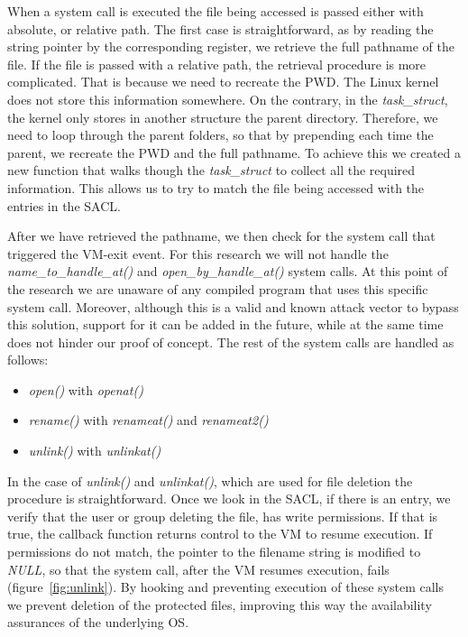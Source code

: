 \par When a system call is executed the file being accessed is passed either with absolute, or relative path. The first case is straightforward, as by reading the string pointer by the corresponding register, we retrieve the full pathname of the file. If the file is passed with a relative path, the retrieval procedure is more complicated. That is because we need to recreate the \ac{PWD}. The Linux kernel does not store this information somewhere. On the contrary, in the \textit{task\_struct}, the kernel only stores in another structure the parent directory. Therefore, we need to loop through the parent folders, so that by prepending each time the parent, we recreate the \ac{PWD} and the full pathname. To achieve this we created a new function that walks though the \emph{task\_struct} to collect all the required information. This allows us to try to match the file being accessed with the entries in the \ac{SACL}.

\par After we have retrieved the pathname, we then check for the system call that triggered the VM-exit event. For this research we will not handle the \textit{name\_to\_handle\_at()} and \textit{open\_by\_handle\_at()} system calls. At this point of the research we are unaware of any compiled program that uses this specific system call. Moreover, although this is a valid and known attack vector to bypass this solution, support for it can be added in the future, while at the same time does not hinder our proof of concept. The rest of the system calls are handled as follows: 
\begin{itemize}
	\item \textit{open()} with \textit{openat()}
	\item \textit{rename()} with \textit{renameat()} and \textit{renameat2()}
	\item \textit{unlink()} with \textit{unlinkat()}
\end{itemize}

\par In the case of \textit{unlink()} and \textit{unlinkat()}, which are used for file deletion the procedure is straightforward. Once we look in the \ac{SACL}, if there is an entry, we verify that the user or group deleting the file, has write permissions. If that is true, the callback function returns control to the \ac{VM} to resume execution. If permissions do not match, the pointer to the filename string is modified to \textit{NULL}, so that the system call, after the \ac{VM} resumes execution, fails (figure~\ref{fig:unlink}). By hooking and preventing execution of these system calls we prevent deletion of the protected files, improving this way the availability assurances of the underlying \ac{OS}.

